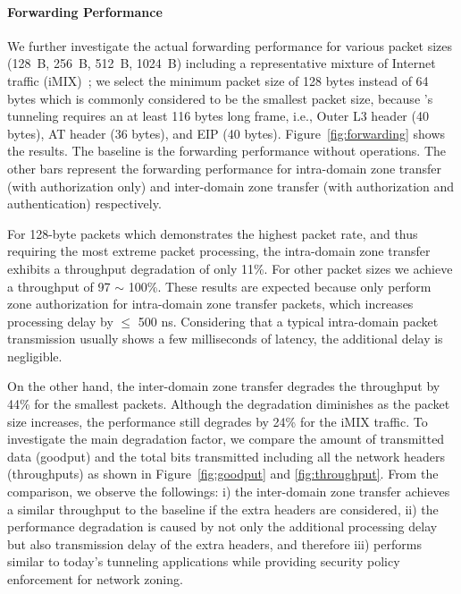 \paragraph{Forwarding Performance}
We further investigate the actual forwarding performance for various packet sizes (\SI{128}{B},
\SI{256}{B}, \SI{512}{B}, \SI{1024}{B}) including a representative mixture of Internet traffic
(iMIX)~\cite{rfc6985}; we select the minimum packet size of 128 bytes instead of 64 bytes which is
commonly considered to be the smallest packet size, because \name's tunneling requires an at least 116
bytes long frame, i.e., Outer L3 header (40 bytes), AT header
(36 bytes), and EIP (40 bytes). Figure~\ref{fig:forwarding} shows the results. The
baseline is the forwarding performance without \tp operations. The other bars represent the
forwarding performance for intra-domain zone transfer (with authorization only) and inter-domain
zone transfer (with authorization and authentication) respectively.

For 128-byte packets which demonstrates the highest packet rate, and thus requiring the most
extreme packet processing, the intra-domain zone transfer exhibits a throughput degradation
of only 11\%. For other packet sizes we achieve a throughput of 97 $\sim$ 100\%. These
results are expected because \tps only perform zone authorization for intra-domain zone transfer
packets, which increases processing delay by $\leq$ 500 ns. Considering that
a typical intra-domain packet transmission usually shows a few milliseconds of latency, the
additional delay is negligible.

On the other hand, the inter-domain zone transfer degrades the throughput by 44\% for the
smallest packets. Although the degradation diminishes as the packet size increases, the
performance still degrades by 24\% for the iMIX traffic. To investigate the main degradation
factor, we compare the amount of transmitted data (goodput) and the total bits transmitted
including all the network headers (throughputs) as shown in Figure~\ref{fig:goodput} and
\ref{fig:throughput}. From the comparison, we observe the followings: i) the inter-domain
zone transfer achieves a similar throughput to the baseline if the extra headers are considered,
ii) the performance degradation is caused by not only the additional processing delay but also
transmission delay of the extra headers, and therefore iii) \name performs similar to
today's tunneling applications while providing security policy enforcement for network
zoning.







